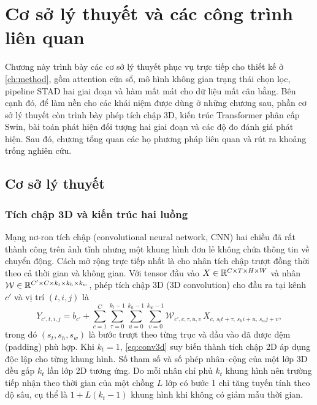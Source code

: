 \chapter{Cơ sở lý thuyết và các công trình liên quan}
\label{ch:related}

Chương này trình bày các cơ sở lý thuyết phục vụ trực tiếp cho thiết kế ở \cref{ch:method}, gồm attention cửa sổ, mô hình không gian trạng thái chọn lọc, pipeline STAD hai giai đoạn và hàm mất mát cho dữ liệu mất cân bằng. Bên cạnh đó, để làm nền cho các khái niệm được dùng ở những chương sau, phần cơ sở lý thuyết còn trình bày phép tích chập 3D, kiến trúc Transformer phân cấp Swin, bài toán phát hiện đối tượng hai giai đoạn và các độ đo đánh giá phát hiện. Sau đó, chương tổng quan các họ phương pháp liên quan và rút ra khoảng trống nghiên cứu.

\section{Cơ sở lý thuyết}
\label{sec:theory}

\subsection{Tích chập 3D và kiến trúc hai luồng}
\label{sec:conv3d}

Mạng nơ-ron tích chập (convolutional neural network, CNN) hai chiều đã rất thành công trên ảnh tĩnh nhưng một khung hình đơn lẻ không chứa thông tin về chuyển động. Cách mở rộng trực tiếp nhất là cho nhân tích chập trượt đồng thời theo cả thời gian và không gian. Với tensor đầu vào $X \in \mathbb{R}^{C \times T \times H \times W}$ và nhân $\mathcal{W} \in \mathbb{R}^{C' \times C \times k_t \times k_h \times k_w}$, phép tích chập 3D (3D convolution) cho đầu ra tại kênh $c'$ và vị trí $(t, i, j)$ là
\begin{equation}
Y_{c',t,i,j} = b_{c'} + \sum_{c=1}^{C} \sum_{\tau=0}^{k_t-1} \sum_{u=0}^{k_h-1} \sum_{v=0}^{k_w-1}
  \mathcal{W}_{c',c,\tau,u,v}\, X_{c,\, s_t t + \tau,\, s_h i + u,\, s_w j + v},
\label{eq:conv3d}
\end{equation}
trong đó $(s_t, s_h, s_w)$ là bước trượt theo từng trục và đầu vào đã được đệm (padding) phù hợp. Khi $k_t = 1$, \cref{eq:conv3d} suy biến thành tích chập 2D áp dụng độc lập cho từng khung hình. Số tham số và số phép nhân--cộng của một lớp 3D đều gấp $k_t$ lần lớp 2D tương ứng. Do mỗi nhân chỉ phủ $k_t$ khung hình nên trường tiếp nhận theo thời gian của một chồng $L$ lớp có bước 1 chỉ tăng tuyến tính theo độ sâu, cụ thể là $1 + L(k_t - 1)$ khung hình khi không có giảm mẫu thời gian.

